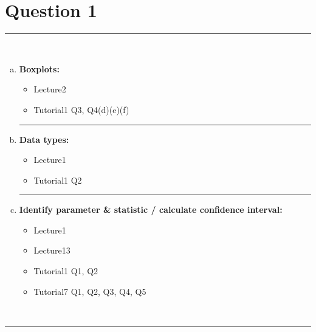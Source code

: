 \documentclass[12pt]{article}
\begin{document}
\section*{Question 1 }
\noindent\rule{\linewidth}{1pt}
\quad\\[-0.5cm]
\begin{enumerate}[a)]
\item {\bf Boxplots:}
\begin{itemize}
\item Lecture2 %
\item Tutorial1 Q3, Q4(d)(e)(f)
\end{itemize}
\begin{center}\noindent\rule{0.4\linewidth}{0.5pt}\end{center}
\item {\bf Data types:}
\begin{itemize}
\item Lecture1 %
\item Tutorial1 Q2
\end{itemize}
    \begin{center}\noindent\rule{0.4\linewidth}{0.5pt}\end{center}
\item {\bf Identify parameter \& statistic / calculate confidence interval:}
\begin{itemize}
\item Lecture1 %
\item Lecture13
\item Tutorial1 Q1, Q2
\item Tutorial7 Q1, Q2, Q3, Q4, Q5
\end{itemize}
\end{enumerate}
\quad\\[-0.3cm]
\noindent\rule{\linewidth}{1pt}

\newpage
\end{document}
